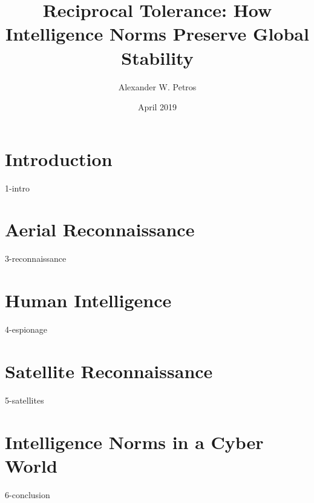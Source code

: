 \documentclass{report}
\title{Reciprocal Tolerance: How Intelligence Norms Preserve Global Stability}
\author{Alexander W. Petros}
\date{April 2019}
\begin{document}
    \maketitle
    \tableofcontents
    \newpage


    \chapter{Introduction}
    {1-intro}

    \chapter{Aerial Reconnaissance}
    {3-reconnaissance}

    \chapter{Human Intelligence}
    {4-espionage}

    \chapter{Satellite Reconnaissance}
    {5-satellites}

    \chapter{Intelligence Norms in a Cyber World}
    {6-conclusion}
\end{document}

